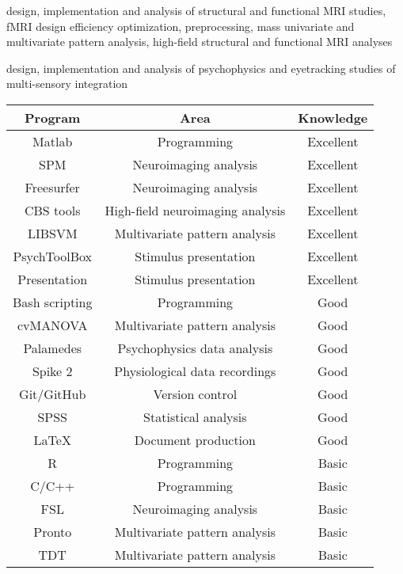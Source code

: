  design, implementation and analysis of structural and functional MRI studies, fMRI design efficiency optimization, preprocessing, mass univariate and multivariate pattern analysis, high-field structural and functional MRI analyses

 design, implementation and analysis of psychophysics and eyetracking studies of multi-sensory integration 


\begin{center}
\begin{tabular}[c]{|c|c|c|}
\hline\hline
Program         & Area                              & Knowledge \\
\hline
Matlab          & Programming                       & Excellent \\ 
SPM             & Neuroimaging analysis             & Excellent \\
Freesurfer      & Neuroimaging analysis             & Excellent \\
CBS tools       & High-field neuroimaging analysis  & Excellent \\
LIBSVM          & Multivariate pattern analysis     & Excellent \\
PsychToolBox    & Stimulus presentation             & Excellent \\
Presentation    & Stimulus presentation             & Excellent \\
Bash scripting  & Programming                       & Good \\
cvMANOVA        & Multivariate pattern analysis     & Good \\
Palamedes       & Psychophysics data analysis       & Good \\
Spike 2         & Physiological data recordings     & Good \\
Git/GitHub      & Version control                   & Good \\
SPSS            & Statistical analysis              & Good \\
\LaTeX          & Document production               & Good \\
R               & Programming                       & Basic \\
C/C++           & Programming                       & Basic \\
FSL             & Neuroimaging analysis             & Basic \\
Pronto          & Multivariate pattern analysis     & Basic \\
TDT             & Multivariate pattern analysis     & Basic \\
\hline\hline
\end{tabular} 
\end{center}

